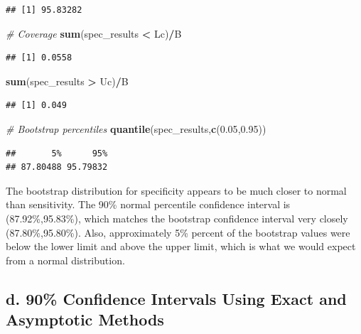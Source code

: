 \documentclass[]{article}
\newenvironment{Shaded}{\begin{snugshade}}{\end{snugshade}}
\newcommand{\CommentTok}[1]{\textcolor[rgb]{0.56,0.35,0.01}{\textit{#1}}}
\newcommand{\FloatTok}[1]{\textcolor[rgb]{0.00,0.00,0.81}{#1}}
\newcommand{\KeywordTok}[1]{\textcolor[rgb]{0.13,0.29,0.53}{\textbf{#1}}}
\newcommand{\NormalTok}[1]{#1}
\newcommand{\OperatorTok}[1]{\textcolor[rgb]{0.81,0.36,0.00}{\textbf{#1}}}
\newcommand{\StringTok}[1]{\textcolor[rgb]{0.31,0.60,0.02}{#1}}
\begin{document}
\begin{verbatim}
## [1] 95.83282
\end{verbatim}

\begin{Shaded}
\begin{Highlighting}[]
\CommentTok{# Coverage}
\KeywordTok{sum}\NormalTok{(spec_results }\OperatorTok{<}\StringTok{ }\NormalTok{Lc)}\OperatorTok{/}\NormalTok{B}
\end{Highlighting}
\end{Shaded}

\begin{verbatim}
## [1] 0.0558
\end{verbatim}

\begin{Shaded}
\begin{Highlighting}[]
\KeywordTok{sum}\NormalTok{(spec_results }\OperatorTok{>}\StringTok{ }\NormalTok{Uc)}\OperatorTok{/}\NormalTok{B}
\end{Highlighting}
\end{Shaded}

\begin{verbatim}
## [1] 0.049
\end{verbatim}

\begin{Shaded}
\begin{Highlighting}[]
\CommentTok{# Bootstrap percentiles}
\KeywordTok{quantile}\NormalTok{(spec_results,}\KeywordTok{c}\NormalTok{(}\FloatTok{0.05}\NormalTok{,}\FloatTok{0.95}\NormalTok{))}
\end{Highlighting}
\end{Shaded}

\begin{verbatim}
##       5%      95% 
## 87.80488 95.79832
\end{verbatim}

The bootstrap distribution for specificity appears to be much closer to
normal than sensitivity. The 90\% normal percentile confidence interval
is (87.92\%,95.83\%), which matches the bootstrap confidence interval
very closely (87.80\%,95.80\%). Also, approximately 5\% percent of the
bootstrap values were below the lower limit and above the upper limit,
which is what we would expect from a normal distribution.

\hypertarget{d.-90-confidence-intervals-using-exact-and-asymptotic-methods}{%
\subsection{d. 90\% Confidence Intervals Using Exact and Asymptotic
Methods}\label{d.-90-confidence-intervals-using-exact-and-asymptotic-methods}}
\end{document}
